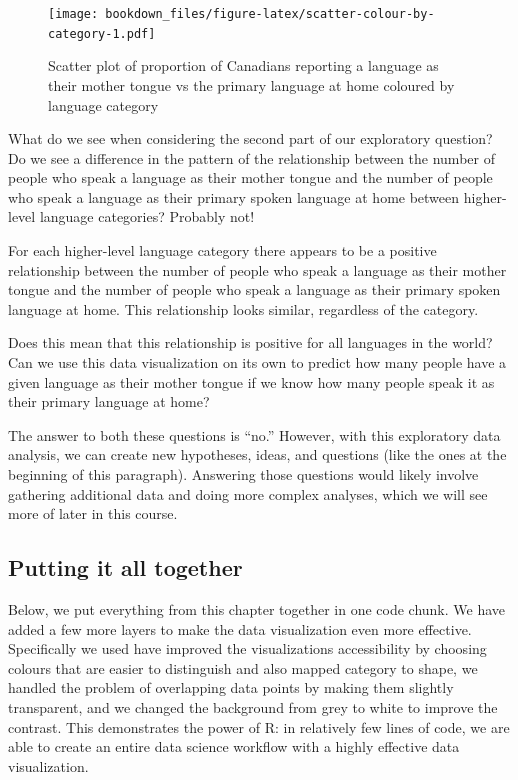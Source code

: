 \documentclass[
]{krantz}
\begin{document}
\begin{figure}
\centering
\texttt{[image: bookdown\_files/figure-latex/scatter-colour-by-category-1.pdf]}
\caption{\label{fig:scatter-colour-by-category}Scatter plot of proportion of Canadians reporting a language as their mother tongue vs the primary language at home coloured by language category}
\end{figure}

What do we see when considering the second part of our exploratory question? Do we see a difference in the pattern of the relationship between the number of people who speak a language as their mother tongue and the number of people who speak a language as their primary spoken language at home between higher-level language categories? Probably not!

For each higher-level language category there appears to be a positive relationship between the number of people who speak a language as their mother tongue and the number of people who speak a language as their primary spoken language at home. This relationship looks similar, regardless of the category.

Does this mean that this relationship is positive for all languages in the world? Can we use this data visualization on its own to predict how many people have a given language as their mother tongue if we know how many people speak it as their primary language at home?

The answer to both these questions is ``no.'' However, with this exploratory data analysis, we can create new hypotheses, ideas,
and questions (like the ones at the beginning of this paragraph). Answering those questions would likely involve gathering additional data and doing more complex analyses, which we will
see more of later in this course.

\hypertarget{putting-it-all-together}{%
\subsection{Putting it all together}\label{putting-it-all-together}}

Below, we put everything from this chapter together in one code chunk. We have
added a few more layers to make the data visualization even more effective.
Specifically we used have improved the visualizations accessibility by choosing
colours that are easier to distinguish and also mapped category to
shape, we handled the problem of overlapping data points by making them slightly
transparent, and we changed the background from grey to white to improve the
contrast. This demonstrates the power of R: in relatively few lines of code, we
are able to create an entire data science workflow with a highly effective
data visualization.
\end{document}
